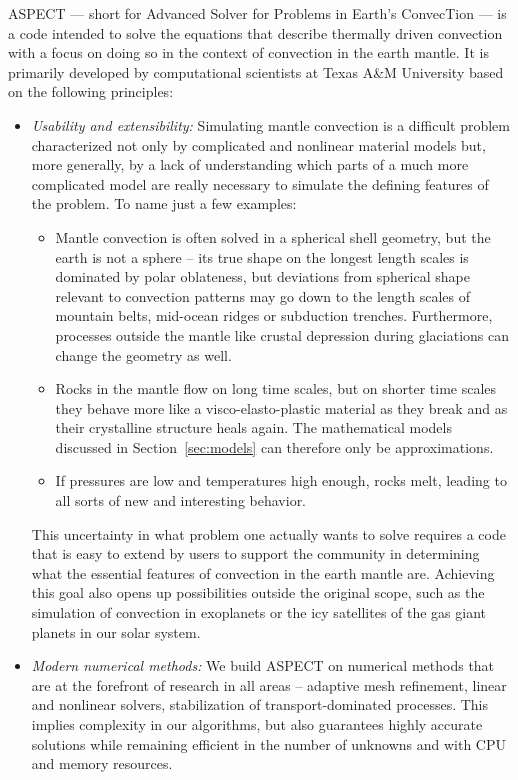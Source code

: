 \documentclass{article}
\newcommand{\aspect}{\textsc{ASPECT}}
\begin{document}
\aspect{} --- short for Advanced Solver for Problems in Earth's ConvecTion ---
is a code intended to solve the equations that describe thermally driven
convection with a focus on doing so in the context of convection in the earth
mantle. It is primarily developed by computational scientists at Texas A\&M
University based on the following principles:
\begin{itemize}
\item \textit{Usability and extensibility:} Simulating mantle convection is a
  difficult problem characterized not only by complicated and nonlinear
  material models but, more generally, by a lack of understanding which parts
  of a much more complicated model are really necessary to simulate the
  defining features of the problem. To name just a few examples:
  \begin{itemize}
  \item Mantle convection is often solved in a spherical shell geometry, but
    the earth is not a sphere -- its true shape on the longest length scales is
    dominated by polar oblateness, but deviations from spherical shape
    relevant to convection patterns may go down to the length scales of
    mountain belts, mid-ocean ridges or subduction trenches. Furthermore,
    processes outside the mantle like crustal depression during glaciations
    can change the geometry as well.
  \item Rocks in the mantle flow on long time scales, but on shorter time
    scales they behave more like a visco-elasto-plastic material as they break
    and as their crystalline structure heals again. The mathematical models
    discussed in Section~\ref{sec:models} can therefore only be
    approximations.
    \item If pressures are low and temperatures high enough, rocks melt,
      leading to all sorts of new and interesting behavior.
  \end{itemize}
  This uncertainty in what problem one actually wants to solve requires a code
  that is easy to extend by users to support the community in determining what
  the essential features of convection in the earth mantle are. Achieving this
  goal also opens up possibilities outside the original scope, such as the
  simulation of convection in exoplanets or the icy satellites of the gas
  giant planets in our solar system.

\item \textit{Modern numerical methods:} We build \aspect{} on numerical
  methods that are at the forefront of research in all areas -- adaptive mesh
  refinement, linear and nonlinear solvers, stabilization of
  transport-dominated processes. This implies complexity in our algorithms,
  but also guarantees highly accurate solutions while remaining efficient in
  the number of unknowns and with CPU and memory resources.


\end{itemize}
\end{document}
